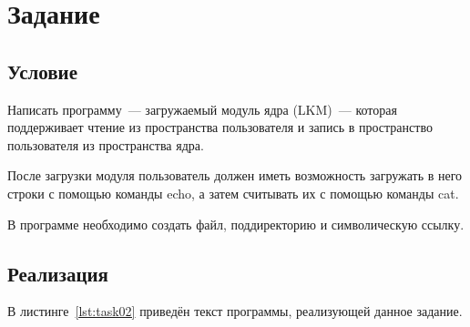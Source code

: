 \chapter{Задание }

\section{Условие}
Написать программу~--- загружаемый модуль ядра (LKM)~--- которая поддерживает чтение из пространства пользователя и запись в пространство пользователя из пространства ядра.

После загрузки модуля пользователь должен иметь возможность загружать в него строки с помощью команды echo, а затем считывать их с помощью команды cat.

В программе необходимо создать файл, поддиректорию и символическую ссылку.

\section{Реализация}

В листинге~\ref{lst:task02} приведён текст программы, реализующей данное задание.


